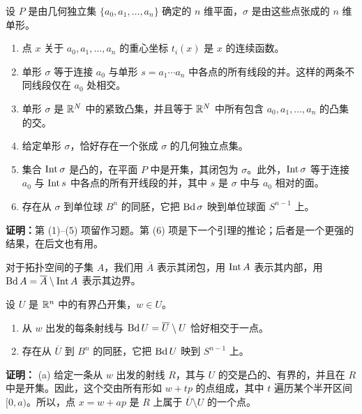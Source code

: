 设 $P$ 是由几何独立集 $\{a_0,a_1,\ldots,a_n\}$ 确定的 $n$ 维平面，$\sigma$ 是由这些点张成的 $n$ 维单形。
\begin{enumerate}[label=(\arabic*)]
\item 点 $x$ 关于 $a_0,a_1,\ldots,a_n$ 的重心坐标 $t_i(x)$ 是 $x$ 的连续函数。
\item 单形 $\sigma$ 等于连接 $a_0$ 与单形 $s=a_1\cdots a_n$ 中各点的所有线段的并。这样的两条不同线段仅在 $a_0$ 处相交。
\item 单形 $\sigma$ 是 $\mathbb{R}^N$ 中的紧致凸集，并且等于 $\mathbb{R}^N$ 中所有包含 $a_0,a_1,\ldots,a_n$ 的凸集的交。
\item 给定单形 $\sigma$，恰好存在一个张成 $\sigma$ 的几何独立点集。
\item 集合 $\operatorname{Int}\sigma$ 是凸的，在平面 $P$ 中是开集，其闭包为 $\sigma$。此外，$\operatorname{Int}\sigma$ 等于连接 $a_0$ 与 $\operatorname{Int} s$ 中各点的所有开线段的并，其中 $s$ 是 $\sigma$ 中与 $a_0$ 相对的面。
\item 存在从 $\sigma$ 到单位球 $B^n$ 的同胚，它把 $\operatorname{Bd}\sigma$ 映到单位球面 $S^{n-1}$ 上。
\end{enumerate}
\noindent\textbf{证明：}第 (1)--(5) 项留作习题。第 (6) 项是下一个引理的推论；后者是一个更强的结果，在后文也有用。

对于拓扑空间的子集 $A$，我们用 $\overline A$ 表示其闭包，用 $\operatorname{Int} A$ 表示其内部，用 $\operatorname{Bd} A=\overline A\setminus\operatorname{Int} A$ 表示其边界。

设 $U$ 是 $\mathbb{R}^n$ 中的有界凸开集，$w\in U$。
\begin{enumerate}[label=(\alph*)]
\item 从 $w$ 出发的每条射线与 $\operatorname{Bd} U=\overline U\setminus U$ 恰好相交于一点。
\item 存在从 $\overline U$ 到 $B^n$ 的同胚，它把 $\operatorname{Bd} U$ 映到 $S^{n-1}$ 上。
\end{enumerate}
\noindent\textbf{证明：}
(a) 给定一条从 $w$ 出发的射线 $R$，其与 $U$ 的交是凸的、有界的，并且在 $R$ 中是开集。因此，这个交由所有形如 $w+tp$ 的点组成，其中 $t$ 遍历某个半开区间 $[0,a)$。所以，点 $x=w+ap$ 是 $R$ 上属于 $\overline U\setminus U$ 的一个点。

